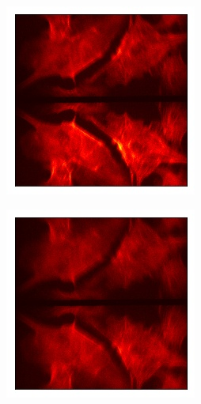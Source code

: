 \begin{figure}[h]
	\centering
	\begin{subfigure}{0.48\textwidth}
		\centering
		\includegraphics[width=\linewidth]{images/sensorless_unsuccessful_start.jpg}
		\caption{}
		\label{fig:sensorless_unsuccessful_start}
	\end{subfigure}
	\begin{subfigure}{0.48\textwidth}
		\centering
		\includegraphics[width=\linewidth]{images/sensorless_unsuccessful_end.jpg}
		\caption{}
		\label{fig:sensorless_unsuccessful_end}
	\end{subfigure}
	

\end{figure}
